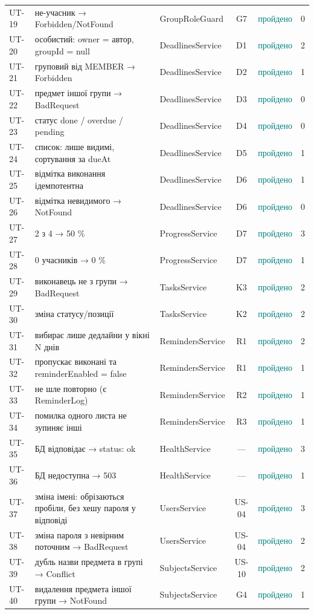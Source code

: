 \begin{longtable}{@{}l L{4.8cm} L{3.7cm} c c r@{}}
UT-19 & не-учасник → Forbidden/NotFound & GroupRoleGuard & G7 & \textcolor{teal}{пройдено} & 0\\
UT-20 & особистий: owner = автор, groupId = null & DeadlinesService & D1 & \textcolor{teal}{пройдено} & 2\\
UT-21 & груповий від MEMBER → Forbidden & DeadlinesService & D2 & \textcolor{teal}{пройдено} & 1\\
UT-22 & предмет іншої групи → BadRequest & DeadlinesService & D3 & \textcolor{teal}{пройдено} & 0\\
UT-23 & статус done / overdue / pending & DeadlinesService & D4 & \textcolor{teal}{пройдено} & 0\\
UT-24 & список: лише видимі, сортування за dueAt & DeadlinesService & D5 & \textcolor{teal}{пройдено} & 1\\
UT-25 & відмітка виконання ідемпотентна & DeadlinesService & D6 & \textcolor{teal}{пройдено} & 1\\
UT-26 & відмітка невидимого → NotFound & DeadlinesService & D6 & \textcolor{teal}{пройдено} & 0\\
UT-27 & 2 з 4 → 50 \% & ProgressService & D7 & \textcolor{teal}{пройдено} & 3\\
UT-28 & 0 учасників → 0 \% & ProgressService & D7 & \textcolor{teal}{пройдено} & 1\\
UT-29 & виконавець не з групи → BadRequest & TasksService & K3 & \textcolor{teal}{пройдено} & 2\\
UT-30 & зміна статусу/позиції & TasksService & K2 & \textcolor{teal}{пройдено} & 2\\
UT-31 & вибирає лише дедлайни у вікні N днів & RemindersService & R1 & \textcolor{teal}{пройдено} & 2\\
UT-32 & пропускає виконані та reminderEnabled = false & RemindersService & R1 & \textcolor{teal}{пройдено} & 1\\
UT-33 & не шле повторно (є ReminderLog) & RemindersService & R2 & \textcolor{teal}{пройдено} & 1\\
UT-34 & помилка одного листа не зупиняє інші & RemindersService & R3 & \textcolor{teal}{пройдено} & 1\\
UT-35 & БД відповідає → status: ok & HealthService & — & \textcolor{teal}{пройдено} & 3\\
UT-36 & БД недоступна → 503 & HealthService & — & \textcolor{teal}{пройдено} & 1\\
UT-37 & зміна імені: обрізаються пробіли, без хешу пароля у відповіді & UsersService & US-04 & \textcolor{teal}{пройдено} & 3\\
UT-38 & зміна пароля з невірним поточним → BadRequest & UsersService & US-04 & \textcolor{teal}{пройдено} & 2\\
UT-39 & дубль назви предмета в групі → Conflict & SubjectsService & US-10 & \textcolor{teal}{пройдено} & 2\\
UT-40 & видалення предмета іншої групи → NotFound & SubjectsService & G4 & \textcolor{teal}{пройдено} & 1\\
\bottomrule
\end{longtable}
